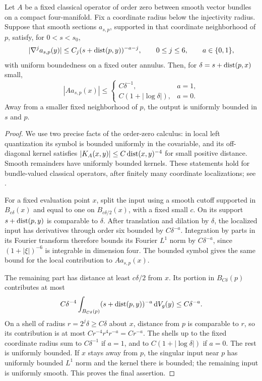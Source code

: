 \begin{lemma}\label{lem:current-radial-operator}
Let $A$ be a fixed classical operator of order zero between smooth vector
bundles on a compact four-manifold.  Fix a coordinate radius below the
injectivity radius.  Suppose that smooth sections $a_{s,p}$, supported in
that coordinate neighborhood of $p$, satisfy, for $0<s<s_0$,
\[
 |\nabla^j a_{s,p}(y)|\le C_j(s+\operatorname{dist}(p,y))^{-a-j},
 \qquad 0\le j\le6,
 \qquad a\in\{0,1\},
\]
with uniform boundedness on a fixed outer annulus.  Then, for
$\delta=s+\operatorname{dist}(p,x)$ small,
\begin{equation}\label{eq:current-radial-operator}
 |Aa_{s,p}(x)|\le
 \begin{cases}
 C\delta^{-1},&a=1,\\
 C(1+|\log\delta|),&a=0.
 \end{cases}
\end{equation}
Away from a smaller fixed neighborhood of $p$, the output is uniformly
bounded in $s$ and $p$.
\end{lemma}

\begin{proof}
We use two precise facts of the order-zero calculus: in local left
quantization its symbol is bounded uniformly in the covariable, and its
off-diagonal kernel satisfies
$|K_A(x,y)|\le C\operatorname{dist}(x,y)^{-4}$ for small positive distance.  Smooth
remainders have uniformly bounded kernels.  These statements hold for
bundle-valued classical operators, after finitely many coordinate
localizations; see
\cite[Section~2, Propositions~2.1--2.2]{TaylorPseudodifferentialNotes}.

For a fixed evaluation point $x$, split the input using a smooth cutoff
supported in $B_{c\delta}(x)$ and equal to one on
$B_{c\delta/2}(x)$, with a fixed small $c$.  On its support
$s+\operatorname{dist}(p,y)$ is comparable to $\delta$.  After translation and dilation
by $\delta$, the localized input has derivatives through order six
bounded by $C\delta^{-a}$.  Integration by parts in its Fourier transform
therefore bounds its Fourier $L^1$ norm by $C\delta^{-a}$, since
$(1+|\xi|)^{-6}$ is integrable in dimension four.  The bounded symbol
gives the same bound for the local contribution to $Aa_{s,p}(x)$.

The remaining part has distance at least $c\delta/2$ from $x$.
Its portion in $B_{C\delta}(p)$ contributes at most
\[
 C\delta^{-4}\int_{B_{C\delta}(p)}
          (s+\operatorname{dist}(p,y))^{-a}\,\mathrm d V_g(y)
 \le C\delta^{-a}.
\]
On a shell of radius $r=2^j\delta\ge C\delta$ about $x$, distance from
$p$ is comparable to $r$, so its contribution is at most
$Cr^{-4}r^4r^{-a}=Cr^{-a}$.  The shells up to the fixed coordinate
radius sum to $C\delta^{-1}$ if $a=1$, and to
$C(1+|\log\delta|)$ if $a=0$.  The rest is uniformly bounded.
If $x$ stays away from $p$, the singular input near $p$ has uniformly
bounded $L^1$ norm and the kernel there is bounded; the remaining input
is uniformly smooth.  This proves the final assertion.
\end{proof}

